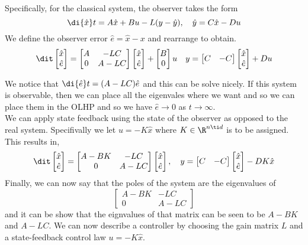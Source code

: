 Specifically, for the classical system, the observer takes the form
$$ \di {\hat x} t = A\hat x + Bu - L(y - \hat y), \quad \hat y = C\hat x - Du $$
We define the observer error $\hat e = \hat x -x$ and rearrange to obtain.
$$ \dit \begin{bmatrix}
  \hat x \\ \hat e
\end{bmatrix} = \begin{bmatrix}
  A & -LC \\ 0 & A - LC
\end{bmatrix} \begin{bmatrix}
  \hat x \\ \hat e
\end{bmatrix} + \begin{bmatrix}
  B \\ 0
\end{bmatrix}u \quad y = \begin{bmatrix}
  C & -C
\end{bmatrix}\begin{bmatrix}
  \hat x \\ \hat e
\end{bmatrix} + Du $$

We notice that $\di {\hat e} t = (A - LC)\hat e$ and this can be solve nicely. If this system is observable, then we can place all the eigenvales where we want and so we can place them in the OLHP and so we have $\hat e \to 0$ as $t \to \infty$. \\

We can apply state feedback using the state of the observer as opposed to the real system. Specifivally we let $u = -K\hat x$ where $K \in \R^{n \ti d}$ is to be assigned. This results in,
$$ \dit \begin{bmatrix}
  \hat x \\ \hat e
\end{bmatrix}  = \begin{bmatrix}
  A - BK & -LC \\
  0 & A - LC
\end{bmatrix}\begin{bmatrix}
  \hat x \\ \hat e
\end{bmatrix}, \quad y = \begin{bmatrix}
  C & -C
\end{bmatrix}\begin{bmatrix}
  \hat x \\ \hat e
\end{bmatrix} - DK\hat x $$
Finally, we can now say that the poles of the system are the eigenvalues of
$$ \begin{bmatrix}
  A - BK & -LC \\
  0 & A - LC
\end{bmatrix} $$
and it can be show that the eignvalues of that matrix can be seen to be $A - BK$ and $A - LC$. We can now describe a controller by choosing the gain matrix $L$ and a state-feedback control law $u = -K\hat x$.

